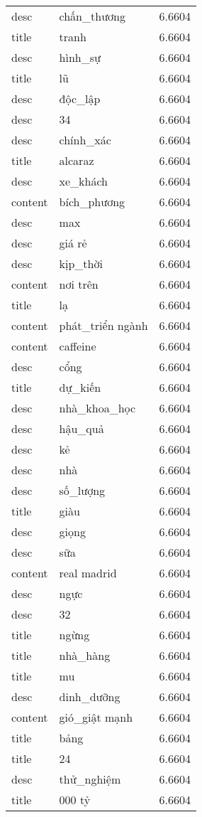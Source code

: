 \documentclass{article}
\begin{document}
\begin{tabular}{lll}
desc & chấn\_thương & 6.6604\\
title & tranh & 6.6604\\
desc & hình\_sự & 6.6604\\
title & lũ & 6.6604\\
desc & độc\_lập & 6.6604\\
desc & 34 & 6.6604\\
desc & chính\_xác & 6.6604\\
title & alcaraz & 6.6604\\
desc & xe\_khách & 6.6604\\
content & bích\_phương & 6.6604\\
desc & max & 6.6604\\
desc & giá rẻ & 6.6604\\
desc & kịp\_thời & 6.6604\\
content & nơi trên & 6.6604\\
title & lạ & 6.6604\\
content & phát\_triển ngành & 6.6604\\
content & caffeine & 6.6604\\
desc & cổng & 6.6604\\
title & dự\_kiến & 6.6604\\
desc & nhà\_khoa\_học & 6.6604\\
desc & hậu\_quả & 6.6604\\
desc & kẻ & 6.6604\\
desc & nhà & 6.6604\\
desc & số\_lượng & 6.6604\\
title & giàu & 6.6604\\
desc & giọng & 6.6604\\
desc & sữa & 6.6604\\
content & real madrid & 6.6604\\
desc & ngực & 6.6604\\
desc & 32 & 6.6604\\
title & ngừng & 6.6604\\
title & nhà\_hàng & 6.6604\\
title & mu & 6.6604\\
desc & dinh\_dưỡng & 6.6604\\
content & gió\_giật mạnh & 6.6604\\
title & bảng & 6.6604\\
title & 24 & 6.6604\\
desc & thử\_nghiệm & 6.6604\\
title & 000 tỷ & 6.6604\\

\end{tabular}
\end{document}
